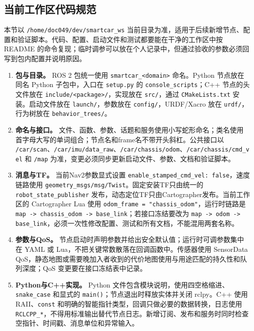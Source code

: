 \documentclass[UTF8,fontset=fandol,11pt,a4paper]{ctexart}
\begin{document}
\subsection{当前工作区代码规范}
本节以 \nolinkurl{/home/doc049/dev/smartcar_ws} 当前目录为准，适用于后续新增节点、配置和验证脚本。代码、配置、启动文件和测试都要能在干净的工作区中按 README 的命令复现；临时调参可以放在个人记录中，但通过验收的参数必须回写到包内配置并说明原因。

{\setlength{\emergencystretch}{4em}
\begin{enumerate}
\item \textbf{包与目录。} ROS 2 包统一使用 \nolinkurl{smartcar_<domain>} 命名。Python 节点放在同名 Python 子包中，入口在 \nolinkurl{setup.py} 的 \nolinkurl{console_scripts}；C++ 节点的头文件放在 \nolinkurl{include/<package>/}，实现放在 \nolinkurl{src/}，通过 \nolinkurl{CMakeLists.txt} 安装。启动文件放在 \nolinkurl{launch/}，参数放在 \nolinkurl{config/}，URDF/Xacro 放在 \nolinkurl{urdf/}，行为树放在 \nolinkurl{behavior_trees/}。
\item \textbf{命名与接口。} 文件、函数、参数、话题和服务使用小写蛇形命名；类名使用首字母大写的单词组合；节点名和frame名不带开头斜杠。公共接口以 \nolinkurl{/car/scan}、\nolinkurl{/car/imu/data_raw}、\nolinkurl{/car/chassis/odom}、\nolinkurl{/car/chassis/cmd_vel} 和 \nolinkurl{/map} 为准，变更必须同步更新启动文件、参数、文档和验证脚本。
\item \textbf{消息与TF。} 当前Nav2参数显式设置 \nolinkurl{enable_stamped_cmd_vel: false}，速度链路使用 \nolinkurl{geometry_msgs/msg/Twist}。固定安装TF只由统一的 \nolinkurl{robot_state_publisher} 发布，动态定位TF只由Cartographer发布。当前工作区的 Cartographer Lua 使用 \nolinkurl{odom_frame = "chassis_odom"}，运行时链路是 \nolinkurl{map -> chassis_odom -> base_link}；若接口冻结要改为 \nolinkurl{map -> odom -> base_link}，必须一次性修改配置、测试和所有文档，不能混用两套名称。
\item \textbf{参数与QoS。} 节点启动时声明参数并给出安全默认值；运行时可调参数集中在 YAML 或 Lua，不把关键常数散落在回调函数中。传感器使用 SensorData QoS，静态地图或需要晚加入者收到的代价地图使用与用途匹配的持久性和队列深度；QoS 变更要在接口冻结表中记录。
\item \textbf{Python与C++实现。} Python 文件包含模块说明，使用四空格缩进、\nolinkurl{snake_case} 和显式的 \nolinkurl{main()}；节点退出时释放实体并关闭 rclpy。C++ 使用 RAII、\nolinkurl{const} 和明确的智能指针类型，回调只做必要的数据转换，日志使用 \nolinkurl{RCLCPP_*}，不得用标准输出替代节点日志。新增订阅、发布和服务时同时检查空指针、时间戳、消息单位和异常输入。

\end{enumerate}}
\end{document}
